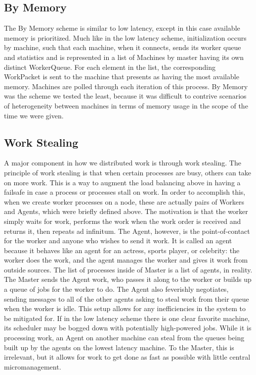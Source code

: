 \documentclass[letterpaper,twocolumn,10pt]{article}
\begin{document}
\subsection{By Memory}

The By Memory scheme is similar to low latency, except in this case available
memory is prioritized.  Much like in the low latency scheme, initialization
occurs by machine, such that each machine, when it connects, sends its worker
queue and statistics and is represented in a list of Machines by master having
its own distinct WorkerQueue. For each element in the list, the corresponding
WorkPacket is sent to the machine that presents as having the most available
memory. Machines are polled through each iteration of this process. By Memory
was the scheme we tested the least, because it was difficult to contrive
scenarios of heterogeneity between machines in terms of memory usage in the
scope of the time we were given.

\subsection{Work Stealing}

A major component in how we distributed work is through work stealing. The
principle of work stealing is that when certain processes are busy, others can
take on more work. This is a way to augment the load balancing above in having
a failsafe in case a process or processes stall on work. In order to accomplish
this, when we create worker processes on a node, these are actually pairs of
Workers and Agents, which were briefly defined above. The motivation is that
the worker simply waits for work, performs the work when the work order is
received and returns it, then repeats ad infinitum. The Agent, however, is the
point-of-contact for the worker and anyone who wishes to send it work. It is
called an agent because it behaves like an agent for an actress, sports player,
or celebrity: the worker does the work, and the agent manages the worker and
gives it work from outside sources. The list of processes inside of Master is a
list of agents, in reality.  The Master sends the Agent work, who passes it
along to the worker or builds up a queue of jobs for the worker to do.  The
Agent also feverishly negotiates, sending messages to all of the other agents
asking to steal work from their queue when the worker is idle. This setup
allows for any inefficiencies in the system to be mitigated for. If in the low
latency scheme there is one clear favorite machine, its scheduler may be bogged
down with potentially high-powered jobs. While it is processing work, an Agent
on another machine can steal from the queues being built up by the agents on
the lowest latency machine. To the Master, this is irrelevant, but it allows
for work to get done as fast as possible with little central micromanagement.
\end{document}
